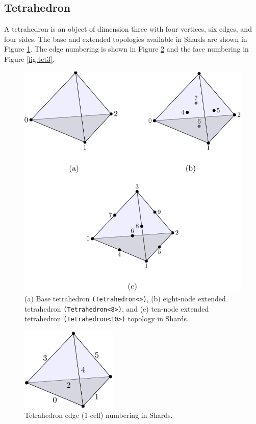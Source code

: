 \documentclass[pdf,12pt,relaxed]{SANDreport}
\begin{document}
\subsection{Tetrahedron}
A tetrahedron is an object of dimension three with four vertices, six edges, and four sides. The base and extended topologies available in Shards are shown in Figure \ref{fig:tet1}. The edge numbering is shown in Figure \ref{fig:tet2} and the face numbering in Figure \ref{fig:tet3}.
 \begin{figure}[ht]
  \begin{center}
   \includegraphics[width=4.5in]{topo_figs/tet_node.pdf}
    \end{center}
   \caption{(a) Base tetrahedron {\tt (Tetrahedron<>)}, (b) eight-node extended tetrahedron {\tt (Tetrahedron<8>)}, and (e) ten-node extended tetrahedron {\tt (Tetrahedron<10>)} topology in Shards.}
 \label{fig:tet1}
\end{figure}

\begin{figure}[ht]
 \begin{center}
    \includegraphics[width=1.8in]{topo_figs/tet_edge.pdf}
  \end{center}
 \caption{Tetrahedron edge (1-cell) numbering in Shards.}
 \label{fig:tet2}
\end{figure}
\end{document}
